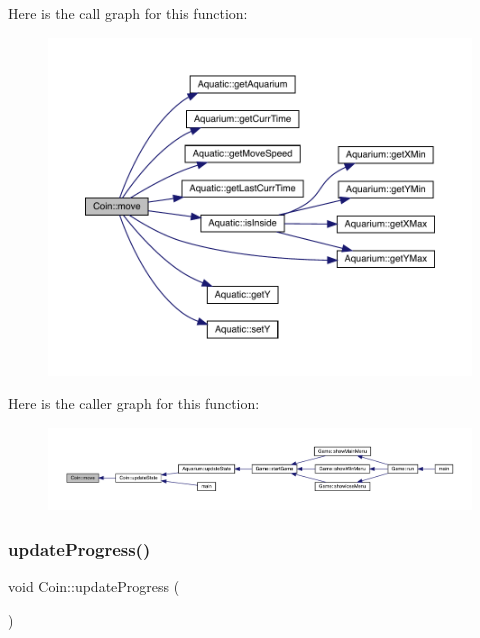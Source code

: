 Here is the call graph for this function\+:\nopagebreak
\begin{figure}[H]
\begin{center}
\leavevmode
\includegraphics[width=350pt]{class_coin_ab62bca5834489b9b483deaa3ca3470e9_cgraph}
\end{center}
\end{figure}
Here is the caller graph for this function\+:
\nopagebreak
\begin{figure}[H]
\begin{center}
\leavevmode
\includegraphics[width=350pt]{class_coin_ab62bca5834489b9b483deaa3ca3470e9_icgraph}
\end{center}
\end{figure}
\mbox{\label{class_coin_ac54d7b690f7e415d2220711f718f638e}} 
\subsubsection{\texorpdfstring{update\+Progress()}{updateProgress()}}
{\footnotesize\ttfamily void Coin\+::update\+Progress (\begin{DoxyParamCaption}{ }\end{DoxyParamCaption})\hspace{0.3cm}{\ttfamily [virtual]}}



